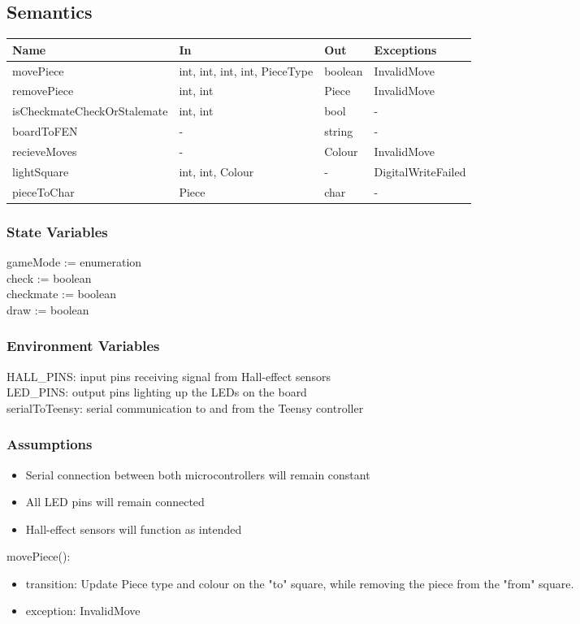 \documentclass[12pt, titlepage]{article}
\begin{document}
\subsection{Semantics}{
  \begin{center}
  \begin{tabular}{p{6cm} p{4cm} p{2cm} p{3cm}}
  \hline
  \textbf{Name} & \textbf{In} & \textbf{Out} & \textbf{Exceptions} \\
  \hline
  movePiece & {int, int, int, int, PieceType} & boolean & InvalidMove \\
  \midrule
  removePiece & {int, int} & Piece & InvalidMove \\
  \midrule
  isCheckmateCheckOrStalemate & {int, int} & bool & - \\
  \midrule
  boardToFEN & - & string & - \\
  \midrule
  recieveMoves & - & Colour & InvalidMove \\
  \midrule
  lightSquare & {int, int, Colour} & - & DigitalWriteFailed \\
  \midrule
  pieceToChar & Piece & char & - \\
  \hline
  \end{tabular}
  \end{center}
}

\subsubsection{State Variables}{
  gameMode := enumeration\\
  check := boolean\\
  checkmate := boolean\\
  draw := boolean\\
}

\subsubsection{Environment Variables}{
  HALL\_PINS: input pins receiving signal from Hall-effect sensors\\
  LED\_PINS: output pins lighting up the LEDs on the board\\
  serialToTeensy: serial communication to and from the Teensy controller\\
}

\subsubsection{Assumptions}{
  \begin{itemize}
    \item Serial connection between both microcontrollers will remain constant
    \item All LED pins will remain connected
    \item Hall-effect sensors will function as intended
  \end{itemize}
}
\noindent movePiece():
\begin{itemize}
\item transition: Update Piece type and colour on the "to" square, while removing the piece from the "from" square.
\item exception: InvalidMove
\end{itemize}
\end{document}
